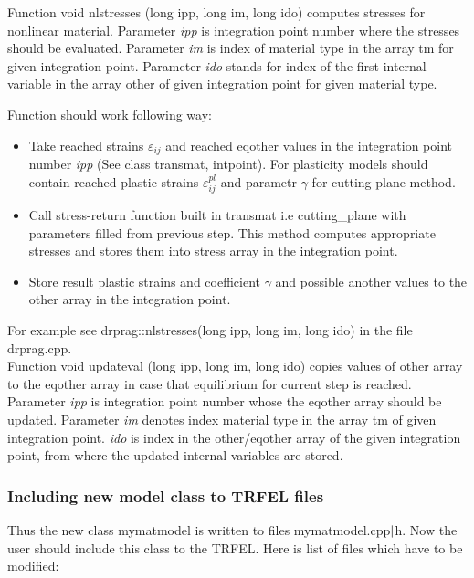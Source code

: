 Function {\sf void nlstresses (long ipp, long im, long ido)} computes stresses for nonlinear material. Parameter
{\it ipp} is integration point number where the stresses should be evaluated. Parameter {\it im} is index of material type
in the array {\sf tm} for given integration point. Parameter {\it ido} stands for index of the first 
internal variable in the array {\sf other} of given integration point for given material type.

Function should work following way:
\begin{itemize}
\item
Take reached strains $\varepsilon_{ij}$ and reached {\sf eqother} values in the integration point number
{\it ipp} (See class {\sf transmat, intpoint}). For plasticity models should contain reached plastic
strains $\varepsilon^{pl}_{ij}$ and parametr $\gamma$ for cutting plane method.
\item
Call stress-return function built in {\sf transmat} i.e {\sf cutting\_plane} with parameters filled from
previous step. This method computes appropriate stresses and stores them into stress array in the
integration point.
\item
Store result plastic strains and coefficient $\gamma$ and possible another values to the {\sf other}
array in the integration point. 
\end{itemize}
For example see {\sf drprag::nlstresses(long ipp, long im, long ido)} in the file drprag.cpp.\\

Function {\sf void updateval (long ipp, long im, long ido)} copies values of {\sf other} array to
the eqother array in case that equilibrium for current step is reached. Parameter {\it ipp} is
integration point number whose the {\sf eqother} array should be updated. Parameter {\it im} denotes
index material type in the array {\sf tm} of given integration point. {\it ido} is index in the
{\sf other/eqother} array of the given integration point, from where the updated internal variables are stored.


\subsubsection {Including new model class to TRFEL files}
Thus the new class {\sf mymatmodel} is written to files  mymatmodel.cpp${\rm |}$h. Now the user should
include this class to the TRFEL. Here is list of files which have to be modified:\\

